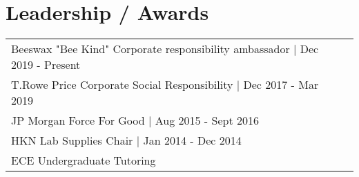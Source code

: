 \documentclass[letterpaper]{deedy-resume-openfont} %
\begin{document}
\begin{minipage}[t]{0.66\textwidth}









\section{Leadership / Awards}

\begin{tabular}{lll}
Beeswax "Bee Kind" Corporate responsibility ambassador | Dec 2019 - Present \\
T.Rowe Price Corporate Social Responsibility | Dec 2017 - Mar 2019 \\
JP Morgan Force For Good | Aug 2015 - Sept 2016 \\
HKN Lab Supplies Chair | Jan 2014 - Dec 2014 \\
ECE Undergraduate Tutoring\\
\end{tabular}





\end{minipage} %
\end{document}
